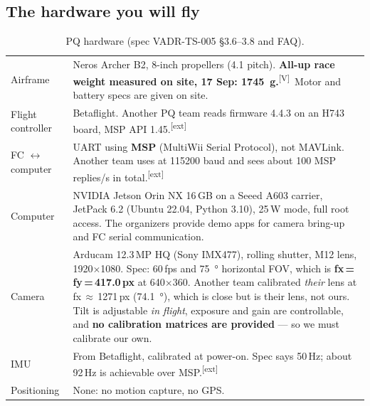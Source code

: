 \documentclass[10pt,a4paper]{article}
\newcommand{\V}{\textsuperscript{\textcolor{okgreen}{[V]}}}
\newcommand{\X}{\textsuperscript{\textcolor{ink}{[ext]}}}
\newcommand{\code}[1]{\texttt{\detokenize{#1}}}
\begin{document}
\subsection{The hardware you will fly}
\begin{table}[H]\centering\small
\begin{tabularx}{\linewidth}{@{}lX@{}}
\toprule
Airframe & Neros Archer B2, 8-inch propellers (4.1 pitch). \textbf{All-up race weight measured on site, 17 Sep: \SI{1745}{g}.}\V\ Motor and battery specs are given on site. \\
Flight controller & Betaflight. Another PQ team reads firmware 4.4.3 on an H743 board, MSP API 1.45.\X \\
FC $\leftrightarrow$ computer & UART using \textbf{MSP} (MultiWii Serial Protocol), not MAVLink. Another team uses \code{/dev/ttyTHS1} at 115200 baud and sees about 100 MSP replies/s in total.\X \\
Computer & NVIDIA Jetson Orin NX 16\,GB on a Seeed A603 carrier, JetPack 6.2 (Ubuntu 22.04, Python 3.10), 25\,W mode, full root access. The organizers provide demo apps for camera bring-up and FC serial communication. \\
Camera & Arducam 12.3\,MP HQ (Sony IMX477), rolling shutter, M12 lens, 1920$\times$1080. Spec: 60\,fps and \SI{75}{\degree} horizontal FOV, which is \textbf{fx\,=\,fy\,=\,417.0\,px} at 640$\times$360. Another team calibrated \emph{their} lens at fx\,$\approx$\,1271\,px (\SI{74.1}{\degree}), which is close but is their lens, not ours. Tilt is adjustable \emph{in flight}, exposure and gain are controllable, and \textbf{no calibration matrices are provided} --- so we must calibrate our own. \\
IMU & From Betaflight, calibrated at power-on. Spec says 50\,Hz; about 92\,Hz is achievable over MSP.\X \\
Positioning & None: no motion capture, no GPS. \\
\bottomrule
\end{tabularx}
\caption{PQ hardware (spec VADR-TS-005 \S3.6--3.8 and FAQ).}
\end{table}
\end{document}
